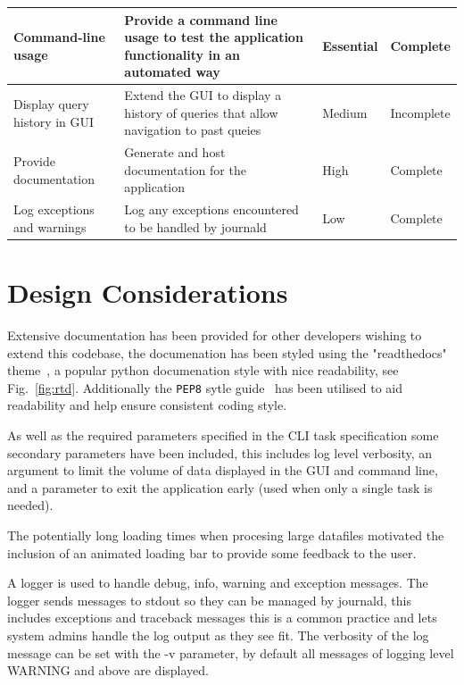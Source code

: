 \documentclass[11pt]{article}
\newcommand{\code}[1]{\colorbox{light-gray}{\texttt{#1}}}
\begin{document}
\begin{center}
\begin{longtable}{|p{3cm}|p{7cm}|l|p{2cm}|}
        \hline
        Command-line usage & Provide a command line usage to test the application functionality in an automated way & \textbf{Essential} & Complete \\
        \hline
        Display query history in GUI & Extend the GUI to display a history of queries that allow navigation to past queies & Medium & Incomplete \\
        \hline
        Provide documentation & Generate and host documentation for the application & High & Complete \\ 
        \hline
        Log exceptions and warnings & Log any exceptions encountered to be handled by journald & Low & Complete \\
        \hline

    \end{longtable}
\end{center}


\section{Design Considerations}

Extensive documentation has been provided for other developers wishing to extend this codebase, the documenation has been styled using the "readthedocs" theme~\autocite{HomeReadDocs}, a popular python documenation style with nice readability, see Fig.~\ref{fig:rtd}. Additionally the \code{PEP8} sytle guide~\autocite{PEPStyleGuide} has been utilised to aid readability and help ensure consistent coding style. 

As well as the required parameters specified in the CLI task specification some secondary parameters have been included, this includes log level verbosity, an argument to limit the volume of data displayed in the GUI and command line, and a parameter to exit the application early (used when only a single task is needed).

The potentially long loading times when procesing large datafiles motivated the inclusion of an animated loading bar to provide some feedback to the user.

A logger is used to handle debug, info, warning and exception messages. The logger sends messages to stdout so they can be managed by journald, this includes exceptions and traceback messages this is a common practice and lets system admins handle the log output as they see fit. The verbosity of the log message can be set with the -v parameter, by default all messages of logging level WARNING and above are displayed.
\end{document}
